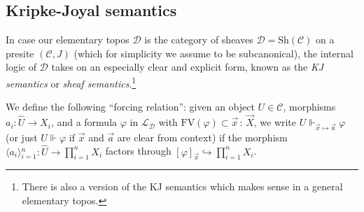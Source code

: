\documentclass[11pt]{amsart}
\newcommand\br[1]{\langle{}#1\rangle{}}
\newcommand\cC{\mathcal{C}}
\newcommand\cD{\mathcal{D}}
\newcommand\cL{\mathcal{L}}
\newcommand\FV{\mathrm{FV}}
\newcommand\hto{\hookrightarrow}
\renewcommand\phi{\varphi}
\newcommand\Sh{\mathrm{Sh}}
\newcommand\tolon{{\,:\,}}
\newcommand\va{\vec{a}}
\newcommand\vX{\vec{X}}
\newcommand\vx{\vec{x}}
\newcommand\wh[1]{\widehat{#1}}
\theoremstyle{definition}
\theoremstyle{remark}
\theoremstyle{plain}
\begin{document}
\subsection{Kripke-Joyal semantics}\label{subsec:kj-semantics}
In case our elementary topos \( \cD \) is the category of sheaves \( \cD = \Sh(\cC) \) on a presite \( (\cC,J) \) (which for simplicity we assume to be subcanonical), the internal logic of \( \cD \) takes on an especially clear and explicit form, known as the \emph{KJ semantics} or \emph{sheaf semantics}.\footnote{%
  There is also a version of the KJ semantics which makes sense in a general elementary topos.
}

We define the following ``forcing relation'': given an object \( U \in \cC \), morphisms \( a_i \colon \wh U \to X_i \), and a formula \( \phi \) in \( \cL_{\cD} \) with \( \FV(\phi) \subset \vx \tolon \vX \), we write \( U \Vdash_{\vx \mapsto \va} \phi \) (or just \( U \Vdash \phi \) if \( \vx \) and \( \va \) are clear from context) if the morphism \( \br{a_i}_{i=1}^n \colon \wh U \to \prod_{i=1}^n X_i \) factors through \( [\phi]_{\vx} \hto \prod_{i=1}^n X_i \).
\end{document}
